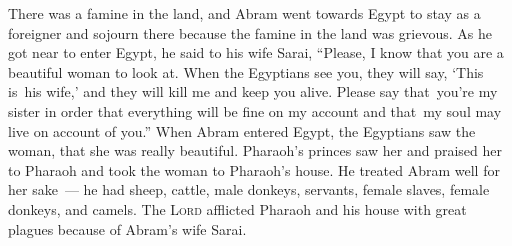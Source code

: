 \begin{inparaenum}
     There was a famine in the land, and Abram went towards Egypt to stay as a foreigner and sojourn there because the famine in the land was grievous.%
     As he got near to enter Egypt, he said to his wife Sarai, ``Please, I know that you are a beautiful woman to look at.%
     When the Egyptians see you, they will say, `This is\understood\ his wife,' and they will kill me and keep you alive.%
     Please say that\understood\ you're my sister in order that everything will be fine on my account and that\understood\ my soul may live on account of you.''%
     When Abram entered Egypt, the Egyptians saw the woman, that she was really beautiful.%
     Pharaoh's princes saw her and praised her to Pharaoh and took the woman to Pharaoh's house.%
     He treated Abram well for her sake~--- he had sheep, cattle, male donkeys, servants, female slaves, female donkeys, and camels.%
     The \textsc{Lord} afflicted Pharaoh and his house with great plagues because of Abram's wife Sarai.%
\end{inparaenum}
